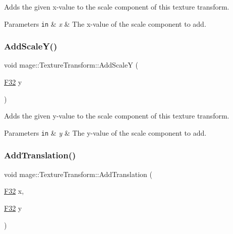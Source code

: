 Adds the given x-\/value to the scale component of this texture transform.


\begin{DoxyParams}[1]{Parameters}
\mbox{\tt in}  & {\em x} & The x-\/value of the scale component to add. \\
\hline
\end{DoxyParams}
\hypertarget{classmage_1_1_texture_transform_a48d0a0ebd014f3fd3d8f30c750763273}{}\label{classmage_1_1_texture_transform_a48d0a0ebd014f3fd3d8f30c750763273} 
\subsubsection{\texorpdfstring{Add\+Scale\+Y()}{AddScaleY()}}
{\footnotesize\ttfamily void mage\+::\+Texture\+Transform\+::\+Add\+ScaleY (\begin{DoxyParamCaption}\item[{\hyperlink{namespacemage_aa97e833b45f06d60a0a9c4fc22ae02c0}{F32}}]{y }\end{DoxyParamCaption})\hspace{0.3cm}{\ttfamily [noexcept]}}

Adds the given y-\/value to the scale component of this texture transform.


\begin{DoxyParams}[1]{Parameters}
\mbox{\tt in}  & {\em y} & The y-\/value of the scale component to add. \\
\hline
\end{DoxyParams}
\hypertarget{classmage_1_1_texture_transform_a759b5363ddc7621b422ebdc90c9e17af}{}\label{classmage_1_1_texture_transform_a759b5363ddc7621b422ebdc90c9e17af} 
\subsubsection{\texorpdfstring{Add\+Translation()}{AddTranslation()}\hspace{0.1cm}{\footnotesize\ttfamily [1/3]}}
{\footnotesize\ttfamily void mage\+::\+Texture\+Transform\+::\+Add\+Translation (\begin{DoxyParamCaption}\item[{\hyperlink{namespacemage_aa97e833b45f06d60a0a9c4fc22ae02c0}{F32}}]{x,  }\item[{\hyperlink{namespacemage_aa97e833b45f06d60a0a9c4fc22ae02c0}{F32}}]{y }\end{DoxyParamCaption})\hspace{0.3cm}{\ttfamily [noexcept]}}

